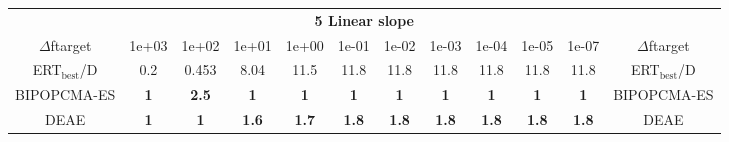 \begin{tabular}{cccccccccccc}
 & \multicolumn{10}{c}{{\normalsize \textbf{5 Linear slope}}}\\
$\Delta$ftarget& 1e+03& 1e+02& 1e+01& 1e+00& 1e-01& 1e-02& 1e-03& 1e-04& 1e-05& 1e-07 & $\Delta$ftarget \\
ERT$_{\textrm{best}}$/D& 0.2& 0.453& 8.04& 11.5& 11.8& 11.8& 11.8& 11.8& 11.8& 11.8 & ERT$_{\textrm{best}}$/D \\
\hline
BIPOPCMA-ES & \textbf{1} & \textbf{2.5} & \textbf{1} & \textbf{1} & \textbf{1} & \textbf{1} & \textbf{1} & \textbf{1} & \textbf{1} & \textbf{1} & BIPOPCMA-ES \cite{add_an_entry_for_BIPOPCMA-ES_in_bbob.bib}\\
DEAE & \textbf{1} & \textbf{1} & \textbf{1.6} & \textbf{1.7} & \textbf{1.8} & \textbf{1.8} & \textbf{1.8} & \textbf{1.8} & \textbf{1.8} & \textbf{1.8} & DEAE \cite{add_an_entry_for_DEAE_in_bbob.bib}
\end{tabular}
